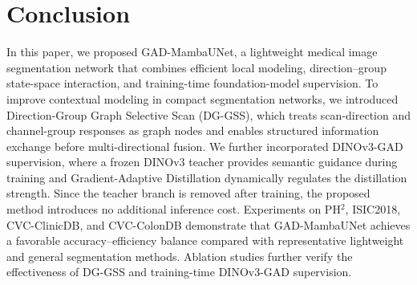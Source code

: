 \documentclass[conference]{IEEEtran}
\begin{document}
















% 

\section{Conclusion}

In this paper, we proposed GAD-MambaUNet, a lightweight medical image segmentation network that combines efficient local modeling, direction--group state-space interaction, and training-time foundation-model supervision. To improve contextual modeling in compact segmentation networks, we introduced Direction-Group Graph Selective Scan (DG-GSS), which treats scan-direction and channel-group responses as graph nodes and enables structured information exchange before multi-directional fusion. We further incorporated DINOv3-GAD supervision, where a frozen DINOv3 teacher provides semantic guidance during training and Gradient-Adaptive Distillation dynamically regulates the distillation strength. Since the teacher branch is removed after training, the proposed method introduces no additional inference cost. Experiments on PH$^2$, ISIC2018, CVC-ClinicDB, and CVC-ColonDB demonstrate that GAD-MambaUNet achieves a favorable accuracy--efficiency balance compared with representative lightweight and general segmentation methods. Ablation studies further verify the effectiveness of DG-GSS and training-time DINOv3-GAD supervision.




\end{document}
